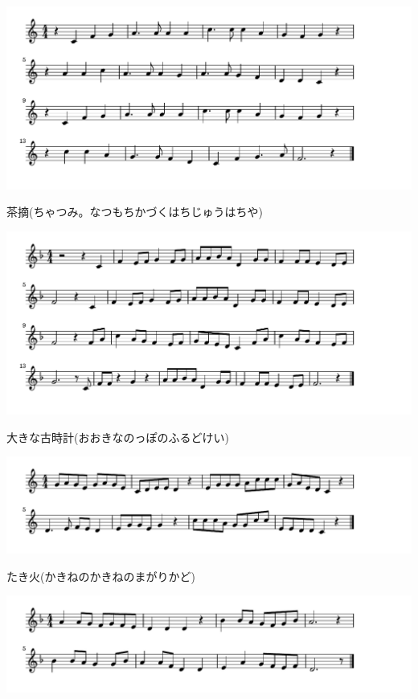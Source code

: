 \documentclass[a4paper]{ltjsarticle}
\begin{document}
\includegraphics[clip]{chatsumi_crop.pdf}

\vspace{-10mm} \hspace{10mm}
茶摘(ちゃつみ。なつもちかづくはちじゅうはちや)

\includegraphics[clip]{okinafurudokei_crop.pdf}

\vspace{-10mm} \hspace{10mm}
大きな古時計(おおきなのっぽのふるどけい)

\includegraphics[clip]{takibi_crop.pdf}

\vspace{-10mm} \hspace{10mm}
たき火(かきねのかきねのまがりかど)

\includegraphics[clip]{shikinouta_crop.pdf}
\end{document}
